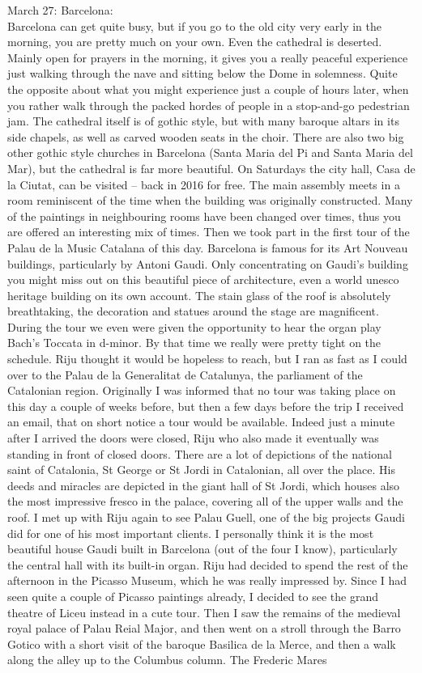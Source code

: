 March 27: Barcelona:\\
Barcelona can get quite busy, but if you go to the old city very early in the morning, you are pretty much on your own. Even the cathedral is deserted. Mainly open for prayers in the morning, it gives you a really peaceful experience just walking through the nave and sitting below the Dome in solemness. Quite the opposite about what you might experience just a couple of hours later, when you rather walk through the packed hordes of people in a stop-and-go pedestrian jam. The cathedral itself is of gothic style, but with many baroque altars in its side chapels, as well as carved wooden seats in the choir. There are also two big other gothic style churches in Barcelona (Santa Maria del Pi and Santa Maria del Mar), but the cathedral is far more beautiful. On Saturdays the city hall, Casa de la Ciutat, can be visited -- back in 2016 for free. The main assembly meets in a room reminiscent of the time when the building was originally constructed. Many of the paintings in neighbouring rooms have been changed over times, thus you are offered an interesting mix of times. Then we took part in the first tour of the Palau de la Music Catalana of this day. Barcelona is famous for its Art Nouveau buildings, particularly by Antoni Gaudi. Only concentrating on Gaudi's building you might miss out on this beautiful piece of architecture, even a world unesco heritage building on its own account. The stain glass of the roof is absolutely breathtaking, the decoration and statues around the stage are magnificent. During the tour we even were given the opportunity to hear the organ play Bach's Toccata in d-minor. By that time we really were pretty tight on the schedule. Riju thought it would be hopeless to reach, but I ran as fast as I could over to the Palau de la Generalitat de Catalunya, the parliament of the Catalonian region. Originally I was informed that no tour was taking place on this day a couple of weeks before, but then a few days before the trip I received an email, that on short notice a tour would be available. Indeed just a minute after I arrived the doors were closed, Riju who also made it eventually was standing in front of closed doors. There are a lot of depictions of the national saint of Catalonia, St George or St Jordi in Catalonian, all over the place. His deeds and miracles are depicted in the giant hall of St Jordi, which houses also the most impressive fresco in the palace, covering all of the upper walls and the roof. I met up with Riju again to see Palau Guell, one of the big projects Gaudi did for one of his most important clients. I personally think it is the most beautiful house Gaudi built in Barcelona (out of the four I know), particularly the central hall with its built-in organ. Riju had decided to spend the rest of the afternoon in the Picasso Museum, which he was really impressed by. Since I had seen quite a couple of Picasso paintings already, I decided to see the grand theatre of Liceu instead in a cute tour. Then I saw the remains of the medieval royal palace of Palau Reial Major, and then went on a stroll through the Barro Gotico with a short visit of the baroque Basilica de la Merce, and then a walk along the alley up to the Columbus column. The Frederic Mares 